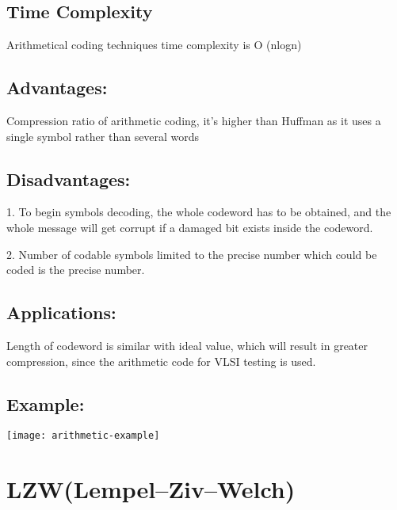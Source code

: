 \documentclass[a4paper, 12pt]{article}
\begin{document}
\subsection{ Time Complexity}
\par Arithmetical coding techniques time complexity is O (nlogn)
\\

\subsection{Advantages:}
\par Compression ratio of arithmetic coding, it’s higher than Huffman as it uses 
a single symbol rather than several words
\\

\subsection{Disadvantages:}
\par 1. To begin symbols decoding, the whole codeword has to be obtained, and the 
whole message will get corrupt if a damaged bit exists inside the codeword.
\\
\par 2. Number of codable symbols limited to the precise number which could be 
coded is the precise number. 
\\

\subsection{ Applications:}
\par Length of codeword is similar with ideal value, which will result in greater 
compression, since the arithmetic code for VLSI testing is used.\\

\subsection{Example:}
\texttt{[image: arithmetic-example]}
\vspace{5mm}


\newpage
\section{LZW(Lempel–Ziv–Welch)}
\end{document}
